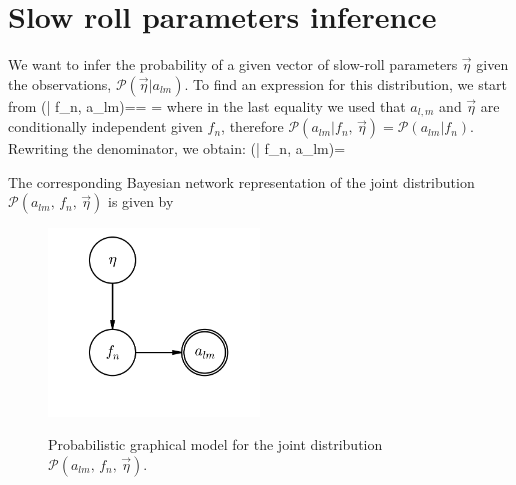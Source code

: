\documentclass[useAMS,usenatbib,a4paper,onecolumn]{mn2e}
\begin{document}

\section{Slow roll parameters inference}

 We want to infer the probability of a given vector of slow-roll parameters $\vec{\eta}$ given the observations, $\mathcal{P}(\vec{\eta}| a_{lm})$. To find an expression for this distribution, we start from
 \be
 	(\vec{\eta}| f_n, a_{lm})== = 
 \ee
where in the last equality we used that $a_{l,m}$ and $\vec{\eta}$ are conditionally independent given $f_n$, therefore $\mathcal{P}( a_{lm}| f_n, \,\vec{\eta})= \mathcal{P}( a_{lm}| f_n)$. Rewriting the denominator, we obtain:
\be
	(\vec{\eta}| f_n, a_{lm})=
\ee

The corresponding Bayesian network representation of the joint distribution $\mathcal{P}(a_{lm},\,f_n,\,\vec{\eta} )$ is given by

\begin{figure}[h]
\begin{center}
\centering
\includegraphics[width=0.50\textwidth]{figures/inflation.png}\\
\caption{\label{inflationPGM} Probabilistic graphical model for the joint distribution $\mathcal{P}(a_{lm},\,f_n,\,\vec{\eta} )$.
}

\end{center}
\end{figure}
\end{document}
